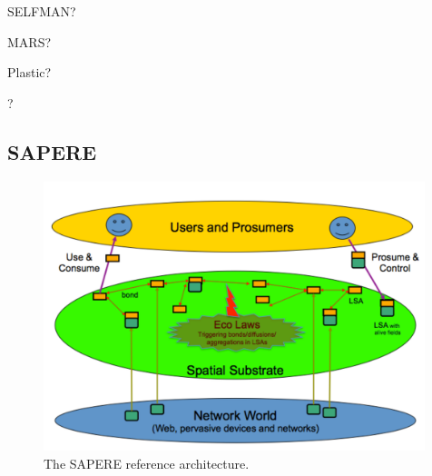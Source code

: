 \documentclass[12pt,a4paper,twoside,openright]{book}
\begin{document}
SELFMAN? \cite{selfman}

MARS? \cite{mars}

Plastic? \cite{plastic}

\cartago{}? \cite{RPV-JAAMAS2011}

\subsection{SAPERE}
\begin{figure}
\centering
\includegraphics[width=0.99\textwidth]{img/architecture_2.pdf}
\caption[SAPERE reference architecture]{The SAPERE reference architecture.}
\label{img:sapere-architecture}
\end{figure}
\end{document}
